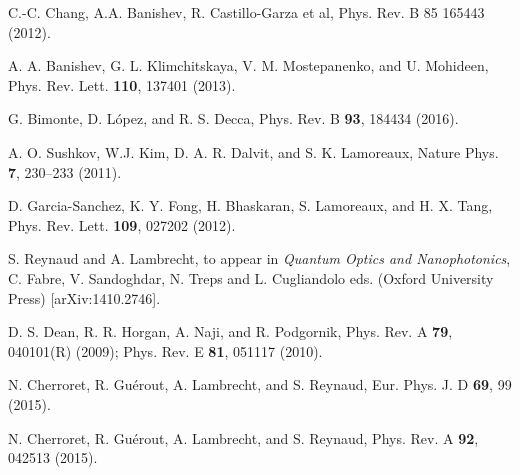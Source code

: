 \documentclass[doublecol]{epl2}
\begin{document}
\begin{thebibliography}{0}
C.-C. Chang, A.A. Banishev, R. Castillo-Garza et al,
Phys. Rev. B 85 165443 (2012). 

A. A. Banishev, G. L. Klimchitskaya, V. M. Mostepanenko, and U. Mohideen,
Phys. Rev. Lett. \textbf{110}, 137401 (2013).

G. Bimonte, D. L\'opez, and R. S. Decca,
Phys. Rev. B \textbf{93}, 184434 (2016).


 A. O. Sushkov, W.J. Kim, D. A. R. Dalvit, and S. K. Lamoreaux,
Nature Phys.   \textbf{7}, 230--233 (2011).

 D. Garcia-Sanchez, K. Y. Fong, H. Bhaskaran, S. Lamoreaux, and H. X. Tang,
Phys. Rev. Lett.  \textbf{109}, 027202 (2012).


S. Reynaud and A. Lambrecht, to appear in
\textit{Quantum Optics and Nanophotonics}, 
C. Fabre, V. Sandoghdar, N. Treps and L. Cugliandolo eds.
(Oxford University Press)
[arXiv:1410.2746].



D. S. Dean, R. R. Horgan, A. Naji, and R. Podgornik, 
Phys. Rev. A \textbf{79}, 040101(R) (2009); Phys. Rev. E \textbf{81}, 051117 (2010).

N. Cherroret, R. Gu\'erout, A. Lambrecht, and S. Reynaud,
Eur. Phys. J. D \textbf{69}, 99 (2015).

N. Cherroret, R. Gu\'erout, A. Lambrecht, and S. Reynaud,
Phys. Rev. A \textbf{92}, 042513 (2015).








\end{thebibliography}
\end{document}
